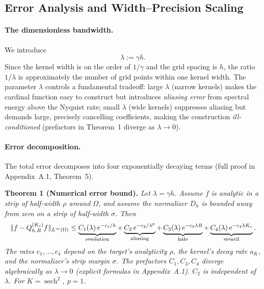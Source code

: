 \documentclass{article}
\begin{document}
\subsection{Error Analysis and Width--Precision Scaling}
\label{subsec:error-analysis}

\paragraph{The dimensionless bandwidth.}
We introduce
\[
  \lambda := \gamma h.
\]
Since the kernel width is on the order of \(1/\gamma\) and the grid spacing is \(h\), the ratio \(1/\lambda\) is approximately the number of grid points within one kernel width.  The parameter \(\lambda\) controls a fundamental tradeoff: large \(\lambda\) (narrow kernels) makes the cardinal function easy to construct but introduces \emph{aliasing error} from spectral energy above the Nyquist rate; small \(\lambda\) (wide kernels) suppresses aliasing but demands large, precisely cancelling coefficients, making the construction \emph{ill-conditioned} (prefactors in Theorem~1 diverge as \(\lambda\to 0\)).

\paragraph{Error decomposition.}
The total error decomposes into four exponentially decaying terms (full proof in Appendix~A.1, Theorem~5).

\medskip
\noindent\textbf{Theorem 1 (Numerical error bound).}
\emph{Let \(\lambda = \gamma h\).  Assume \(f\) is analytic in a strip of half-width \(\rho\) around \(\Omega\), and assume the normalizer \(D_h\) is bounded away from zero on a strip of half-width \(\sigma\).  Then}
\begin{equation}
  \resizebox{\columnwidth}{!}{$\displaystyle
    \|f - Q_{h,R}^{(K_c)} f\|_{L^\infty(\Omega)}
    \le
    \underbrace{C_1(\lambda)\,e^{-c_1/h}}_{\text{resolution}}
    +
    \underbrace{C_2\,e^{-c_2/\lambda^p}}_{\text{aliasing}}
    +
    \underbrace{C_3(\lambda)\,e^{-c_3\lambda R}}_{\text{halo}}
    +
    \underbrace{C_4(\lambda)\,e^{-c_4\lambda K_c}}_{\text{stencil}}.
  $}
  \label{eq:error-bound}
\end{equation}
\emph{The rates \(c_1,\ldots,c_4\) depend on the target's analyticity \(\rho\), the kernel's decay rate \(a_K\), and the normalizer's strip margin \(\sigma\).  The prefactors \(C_1,C_3,C_4\) diverge algebraically as \(\lambda\to 0\) (explicit formulas in Appendix~A.1).  \(C_2\) is independent of \(\lambda\).  For \(K=\operatorname{sech}^2\), \(p=1\).}
\end{document}
